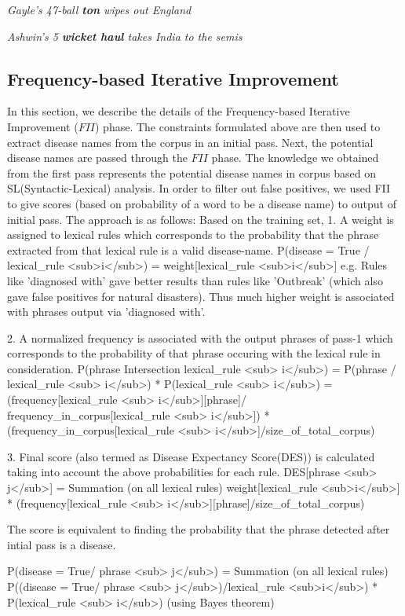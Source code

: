 \documentclass{article}
\begin{document}
\textit{Gayle's 47-ball \textbf{ton} wipes out England }

\textit{Ashwin's 5 \textbf{wicket haul} takes India to the semis}


\subsection{Frequency-based Iterative Improvement}

In this section, we describe the details of the Frequency-based Iterative Improvement ($FII$) phase. 
The constraints formulated above are then used to extract disease names from the corpus in an initial pass. Next, the potential disease names are passed through the $FII$ phase.
The knowledge we obtained from the first pass represents the potential disease names in corpus based on SL(Syntactic-Lexical) analysis. In order to filter out false positives, we used FII to give scores (based on probability of a word to be a disease name) to output of initial pass.
The approach is as follows:
Based on the training set, 
1. A weight is assigned to lexical rules which corresponds to the probability that the phrase extracted from that lexical rule is a valid disease-name.
  P(disease = True / lexical_rule <sub>i</sub>) = weight[lexical_rule <sub>i</sub>]
e.g. Rules like 'diagnosed with' gave better results than rules like 'Outbreak' (which also gave false positives for natural disasters). Thus much higher weight is associated with phrases output via 'diagnosed with'. 

2. A normalized frequency is associated with the output phrases of pass-1 which corresponds to the probability of that phrase occuring with the lexical rule in consideration. 
  P(phrase Intersection lexical_rule <sub> i</sub>) = P(phrase / lexical_rule <sub> i</sub>) * P(lexical_rule <sub> i</sub>) = (frequency[lexical_rule <sub> i</sub>][phrase]/ frequency_in_corpus[lexical_rule <sub> i</sub>]) * (frequency_in_corpus[lexical_rule <sub> i</sub>]/size_of_total_corpus)

3. Final score (also termed as Disease Expectancy Score(DES)) is calculated taking into account the above probabilities for each rule. 
  DES[phrase <sub> j</sub>] = Summation (on all lexical rules) weight[lexical_rule <sub>i</sub>] * (frequency[lexical_rule <sub> i</sub>][phrase]/size_of_total_corpus)

The score is equivalent to finding the probability that the phrase detected after intial pass is a disease.

  P(disease = True/ phrase <sub> j</sub>) = Summation (on all lexical rules) P((disease = True/ phrase <sub> j</sub>)/lexical_rule <sub>i</sub>) * P(lexical_rule <sub> i</sub>)
  (using Bayes theorem)
\end{document}
